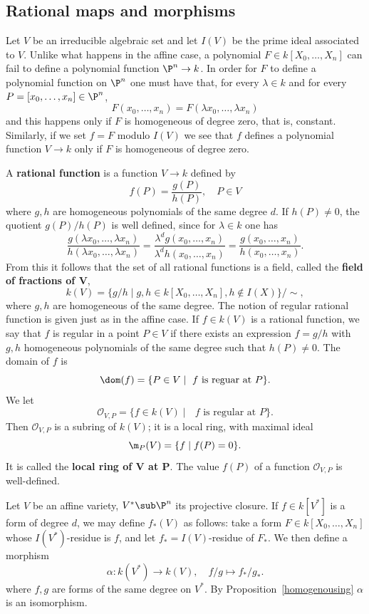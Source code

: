 \subsection{Rational maps and morphisms}
Let $V$ be an irreducible algebraic set and let $I(V)$ be the prime ideal associated to $V$. Unlike what happens in the affine case, a polynomial $F\in k[X_0,\dots,X_n]$ can fail to define a polynomial function $\P^n\to k$. In order for $F$ to define a polynomial function on $\P^n$ one must have that, for every $\lambda\in k$ and for every $P=[x_0,\dots,x_n]\in\P^n$,
\[F(x_0,\dots,x_n)=F(\lambda x_0,\dots,\lambda x_{n})\]
and this happens only if $F$ is homogeneous of degree zero, that is, constant. Similarly, if we set $f=F$ modulo $I(V)$ we see that $f$ defines a polynomial function $V\to k$ only if $F$ is homogeneous of degree zero.\par
A \textbf{rational function} is a function $V\to k$ defined by
\[f(P)=\frac{g(P)}{h(P)},\quad P\in V\]
where $g,h$ are homogeneous polynomials of the same degree $d$. If $h(P)\neq0$, the quotient $g(P)/h(P)$ is well defined, since for $\lambda\in k$ one has
\[\frac{g(\lambda x_0,\dots,\lambda x_{n})}{h(\lambda x_0,\dots,\lambda x_{n})}=\frac{\lambda^dg(x_0,\dots,x_n)}{\lambda^dh(x_0,\dots,x_n)}=\frac{g(x_0,\dots,x_n)}{h(x_0,\dots,x_n)}.\]
From this it follows that the set of all rational functions is a field, called the \textbf{field of fractions of $\bm{V}$},
\[k(V)=\{g/h\mid g,h\in k[X_0,\dots,X_n],h\notin I(X)\}/\sim,\]
where $g,h$ are homogeneous of the same degree. The notion of regular rational function is given just as in the affine case. If $f\in k(V)$ is a rational function, we say that $f$ is regular in a point $P\in V$ if there exists an expression $f=g/h$ with $g,h$ homogeneous polynomials of the same degree such that $h(P)\neq 0$. The domain of $f$ is
\[\dom(f)=\{P\in V\mid\text{ $f$ is reguar at $P$}\}.\]
We let
\[\mathscr{O}_{V,P}=\{f\in k(V)\mid \text{ $f$ is regular at $P$}\}.\]
Then $\mathscr{O}_{V,P}$ is a subring of $k(V)$; it is a local ring, with maximal ideal
\[\m_P(V)=\{f\mid f(P)=0\}.\]
It is called the \textbf{local ring of $\bm{V}$ at $\bm{P}$}. The value $f(P)$ of a function $\mathscr{O}_{V,P}$ is well-defined.
\begin{remark}
Let $V$ be an affine variety, $V^*\sub\P^n$ its projective closure. If $f\in k[V^*]$ is a form of degree $d$, we may define $f_*(V)$ as follows: take a form $F\in k[X_0,\dots,X_n]$ whose $I(V^*)$-residue is $f$, and let $f_*=I(V)$-residue of $F_*$. We then define a morphism \[\alpha:k(V^*)\to k(V),\quad f/g\mapsto f_*/g_*.\]
where $f,g$ are forms of the same degree on $V^*$. By Proposition~\ref{homogenousing} $\alpha$ is an isomorphism.
\end{remark}
